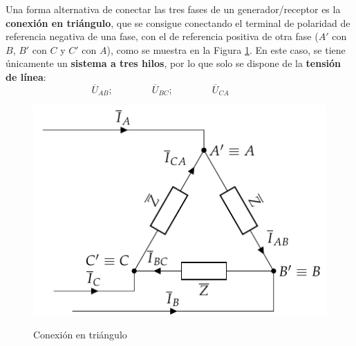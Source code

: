 Una forma alternativa de conectar las tres fases de un
generador/receptor es la \textbf{conexión en triángulo}, que se
consigue conectando el terminal de polaridad de referencia negativa de
una fase, con el de referencia positiva de otra fase ($A'$ con $B$,
$B'$ con $C$ y $C'$ con $A$), como se muestra en la Figura
\ref{fig:conexion_triangulo}. En este caso, se tiene únicamente un
\textbf{sistema a tres hilos}, por lo que solo se dispone de la
\textbf{tensión de línea}:
\begin{equation*}
  \overline{U}_{AB};\qquad\qquad \overline{U}_{BC};\qquad\qquad \overline{U}_{CA}\qquad\qquad
\end{equation*}
\begin{figure}[H]
  \centering
  {\includegraphics{../figs/TrianguloEquilibrado_Receptor.pdf}}
  \caption{Conexión en triángulo}
  \label{fig:conexion_triangulo}
\end{figure}
	
